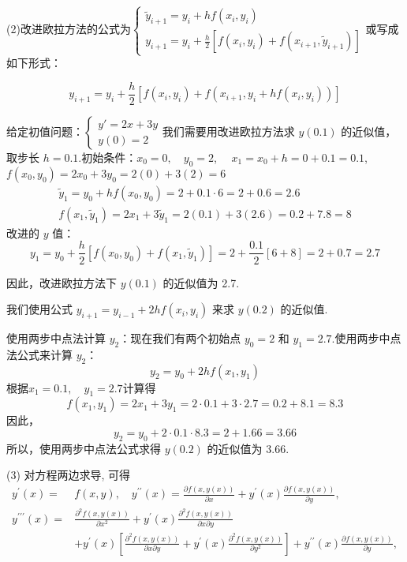\begin{tcolorbox}
(2)改进欧拉方法的公式为$\left\{\begin{array}{l}
    \widetilde{y}_{i+1}= y_i + h f(x_i, y_i)  \\
    y_{i+1} = y_i + \frac{h}{2} \left[ f(x_i, y_i) + f\left(x_{i + 1}, \widetilde{y}_{i+1} \right) \right]
\end{array}\right.$或写成如下形式：


$$y_{i+1} = y_i + \frac{h}{2} \left[ f(x_i, y_i) + f\left(x_{i + 1}, y_i + h f(x_i, y_i) \right) \right]
$$

给定初值问题：$\left\{
\begin{array}{l}
y' = 2x + 3y \\
y(0) = 2
\end{array}
\right.$我们需要用改进欧拉方法求  $y(0.1)$ 的近似值，取步长 $h = 0.1$.初始条件：$x_0 = 0, \quad y_0 = 2$, $\quad x_1 = x_0 + h = 0 + 0.1 = 0.1$, $f(x_0, y_0) = 2x_0 + 3y_0 = 2(0) + 3(2) = 6$
$$
\begin{array}{c}
      \widetilde{y}_{1} = y_0 + h f(x_0, y_0) = 2 + 0.1 \cdot 6 = 2 + 0.6 = 2.6 \\
     f(x_1, \widetilde{y}_{1}) = 2x_1 + 3\widetilde{y}_{1} = 2(0.1) + 3(2.6) = 0.2 + 7.8 = 8
\end{array}
$$
改进的 $y$ 值：
$$
   y_1 = y_0 + \frac{h}{2} \left[ f(x_0, y_0) + f(x_1, \widetilde{y}_{1}) \right] = 2 + \frac{0.1}{2} \left[ 6 + 8 \right] = 2 + 0.7 = 2.7
$$

因此，改进欧拉方法下 $ y(0.1) $ 的近似值为 2.7.

我们使用公式 $ y_{i+1} = y_{i-1} + 2hf(x_i, y_i) $ 来求 $ y(0.2) $ 的近似值.





使用两步中点法计算 $ y_2 $：现在我们有两个初始点 $ y_0 = 2 $ 和 $ y_1 = 2.7 $.使用两步中点法公式来计算 $ y_2 $：
$$
y_2 = y_0 + 2hf(x_1, y_1)
$$
根据$x_1 = 0.1, \quad y_1 = 2.7$计算得
$$
f(x_1, y_1) = 2x_1 + 3y_1 = 2 \cdot 0.1 + 3 \cdot 2.7 = 0.2 +8.1 = 8.3
$$
因此，
$$
y_2 = y_0 + 2 \cdot 0.1 \cdot 8.3 = 2 + 1.66 = 3.66
$$
所以，使用两步中点法公式求得 $ y(0.2) $ 的近似值为 3.66.

(3)
对方程两边求导, 可得
$$
\begin{aligned}
 y^{\prime}(x)=&f(x, y), \quad y^{\prime \prime}(x)=\frac{\partial f(x, y(x))}{\partial x}+y^{\prime}(x) \frac{\partial f(x, y(x))}{\partial y}, \\
y^{\prime \prime \prime}(x)= & \frac{\partial^{2} f(x, y(x))}{\partial x^{2}}+y^{\prime}(x) \frac{\partial^{2} f(x, y(x))}{\partial x \partial y} \\
& +y^{\prime}(x)\left[\frac{\partial^{2} f(x, y(x))}{\partial x \partial y}+y^{\prime}(x) \frac{\partial^{2} f(x, y(x))}{\partial y^{2}}\right]+y^{\prime \prime}(x) \frac{\partial f(x, y(x))}{\partial y},
\end{aligned}
$$


\end{tcolorbox}
